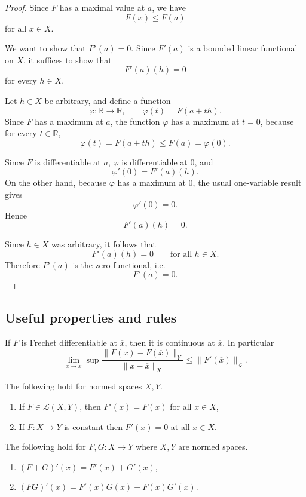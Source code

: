 \begin{proof}
    Since $F$ has a maximal value at $a$, we have
    \[
        F(x) \leq F(a)
    \]
    for all $x \in X$.

    We want to show that $F'(a)=0$. Since $F'(a)$ is a bounded linear
    functional on $X$, it suffices to show that
    \[
        F'(a)(h)=0
    \]
    for every $h \in X$.

    Let $h \in X$ be arbitrary, and define a function
    \[
        \varphi : \mathbb R \to \mathbb R, \qquad \varphi(t)=F(a+th).
    \]
    Since $F$ has a maximum at $a$, the function $\varphi$ has a maximum
    at $t=0$, because for every $t \in \mathbb R$,
    \[
        \varphi(t)=F(a+th)\leq F(a)=\varphi(0).
    \]

    Since $F$ is differentiable at $a$, $\varphi$ is differentiable at
    $0$, and
    \[
        \varphi'(0)=F'(a)(h).
    \]
    On the other hand, because $\varphi$ has a maximum at $0$, the usual
    one-variable result gives
    \[
        \varphi'(0)=0.
    \]
    Hence
    \[
        F'(a)(h)=0.
    \]

    Since $h \in X$ was arbitrary, it follows that
    \[
        F'(a)(h)=0 \qquad \text{for all } h \in X.
    \]
    Therefore $F'(a)$ is the zero functional, i.e.
    \[
        F'(a)=0.
    \]
\end{proof}

\newpage 
\subsection{Useful properties and rules}

\begin{prop}
    If $F$ is Frechet differentiable at $\overline x$, then 
    it is continuous at $\overline x$. In particular 
    \[
        \lim_{x\to\overline x}\sup \frac{\|F(x) - 
        F(\overline x)\|_Y}{\|x-\overline x\|_X} \leq 
        \|F'(\overline x)\|_{\mathcal L}.
    \]
\end{prop}

\begin{prop}
    The following hold for normed spaces $X,Y$.

    \begin{enumerate}
        \item If $F \in \mathcal L(X,Y)$, then 
        $F'(x) = F(x)$ for all $x \in X$, 
        \item If $F : X \to Y$ is constant then 
            $F'(x) = 0$ at all $x \in X$.
    \end{enumerate}
\end{prop}
\begin{prop}
    The following hold for $F,G : X \to Y$ where $X,Y$ are 
    normed spaces.

    \begin{enumerate}
        \item $(F+G)'(x) = F'(x) + G'(x)$, 
        \item $(FG)'(x) = F'(x)G(x) + F(x)G'(x)$.
    \end{enumerate}
\end{prop}

